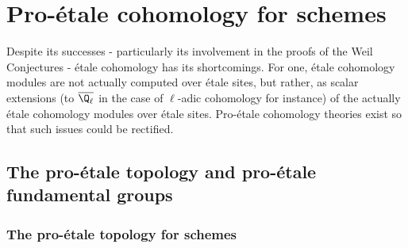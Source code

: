 \section{Pro-\'etale cohomology for schemes}
    Despite its successes - particularly its involvement in the proofs of the Weil Conjectures - \'etale cohomology has its shortcomings. For one, \'etale cohomology modules are not actually computed over \'etale sites, but rather, as scalar extensions (to $\overline{\Q_{\ell}}$ in the case of $\ell$-adic cohomology for instance) of the actually \'etale cohomology modules over \'etale sites. Pro-\'etale cohomology theories exist so that such issues could be rectified. 
    
    \subsection{The pro-\'etale topology and pro-\'etale fundamental groups}
        \subsubsection{The pro-\'etale topology for schemes}
    
